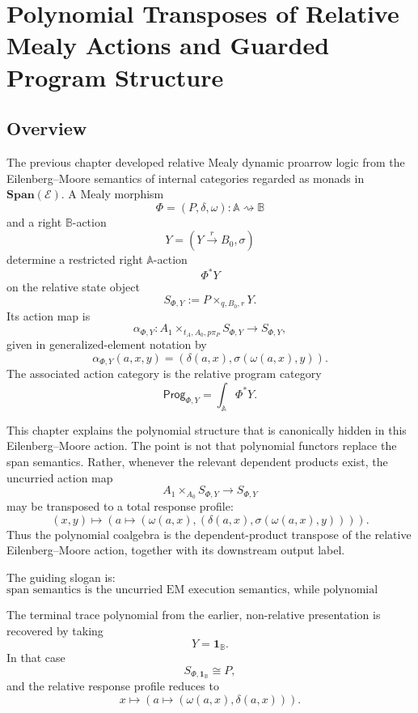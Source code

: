 \chapter{Polynomial Transposes of Relative Mealy Actions and Guarded Program Structure}
\label{ch:polynomial-relative-mealy-actions}

\section{Overview}
\label{sec:poly-relative-overview}

The previous chapter developed relative Mealy dynamic proarrow logic from the
Eilenberg--Moore semantics of internal categories regarded as monads in
\(\mathbf{Span}(\mathcal E)\).  A Mealy morphism
\[
\Phi=(P,\delta,\omega):\mathbb A\rightsquigarrow\mathbb B
\]
and a right \(\mathbb B\)-action
\[
Y=(Y\xrightarrow{r}B_0,\sigma)
\]
determine a restricted right \(\mathbb A\)-action
\[
\Phi^\ast Y
\]
on the relative state object
\[
S_{\Phi,Y}:=P\times_{q,B_0,r}Y.
\]
Its action map is
\[
\alpha_{\Phi,Y}:
A_1\times_{t_A,A_0,p\pi_P}S_{\Phi,Y}
\longrightarrow
S_{\Phi,Y},
\]
given in generalized-element notation by
\[
\alpha_{\Phi,Y}(a,x,y)
=
\left(
\delta(a,x),
\sigma(\omega(a,x),y)
\right).
\]
The associated action category is the relative program category
\[
\mathsf{Prog}_{\Phi,Y}
=
\int_{\mathbb A}\Phi^\ast Y.
\]

This chapter explains the polynomial structure that is canonically hidden in
this Eilenberg--Moore action.  The point is not that polynomial functors replace
the span semantics.  Rather, whenever the relevant dependent products exist,
the uncurried action map
\[
A_1\times_{A_0}S_{\Phi,Y}\to S_{\Phi,Y}
\]
may be transposed to a total response profile:
\[
(x,y)
\longmapsto
\left(
a
\longmapsto
\left(
\omega(a,x),
\left(\delta(a,x),\sigma(\omega(a,x),y)\right)
\right)
\right).
\]
Thus the polynomial coalgebra is the dependent-product transpose of the
relative Eilenberg--Moore action, together with its downstream output label.

The guiding slogan is:
\[
\boxed{
\text{span semantics is the uncurried EM execution semantics, while
polynomial semantics is its curried total-response form.}
}
\]

The terminal trace polynomial from the earlier, non-relative presentation is
recovered by taking
\[
Y=\mathbf 1_{\mathbb B}.
\]
In that case
\[
S_{\Phi,\mathbf 1_{\mathbb B}}\cong P,
\]
and the relative response profile reduces to
\[
x
\longmapsto
\left(
a
\longmapsto
(\omega(a,x),\delta(a,x))
\right).
\]

